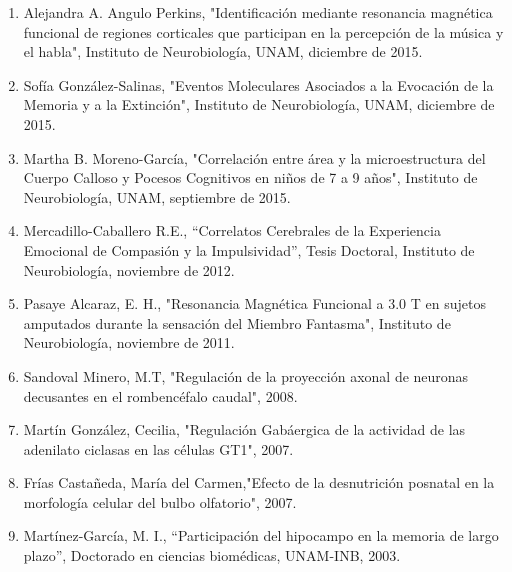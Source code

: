 \begin{enumerate}
\item Alejandra A. Angulo Perkins, "Identificación mediante resonancia magnética funcional de regiones corticales que 
participan en la percepción de la música y el habla", Instituto de Neurobiología, UNAM, diciembre de 2015.

\item Sofía González-Salinas, "Eventos Moleculares Asociados a la Evocación de la Memoria y a la Extinción", Instituto de 
Neurobiología, UNAM, diciembre de 2015.

\item Martha B. Moreno-García, "Correlación entre área y la microestructura del Cuerpo Calloso y Pocesos Cognitivos en 
niños 
de 7 a 9 años", Instituto de Neurobiología, UNAM, septiembre de 2015.

\item Mercadillo-Caballero R.E., “Correlatos Cerebrales de la Experiencia Emocional de Compasión y la Impulsividad”, Tesis 
Doctoral, Instituto de Neurobiología, noviembre de 2012.

\item Pasaye Alcaraz, E. H., "Resonancia Magnética Funcional a 3.0 T en sujetos amputados durante la sensación del Miembro 
Fantasma", Instituto de Neurobiología, noviembre de 2011.

\item Sandoval Minero, M.T, "Regulación de la proyección axonal de neuronas decusantes en el rombencéfalo caudal", 2008.

\item Martín González, Cecilia, "Regulación Gabáergica de la actividad de las adenilato ciclasas en las células GT1", 
2007.

\item Frías Castañeda, María del Carmen,"Efecto de la desnutrición posnatal en la morfología celular del bulbo olfatorio", 
2007.

\item Martínez-García, M. I., “Participación del hipocampo en la memoria de largo plazo”, Doctorado en ciencias biomédicas, 
UNAM-INB, 2003.

\end{enumerate}
